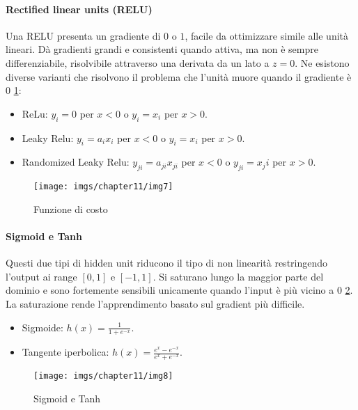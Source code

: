 		\paragraph{Rectified linear units (RELU)}
		Una RELU presenta un gradiente di $0$ o $1$, facile da ottimizzare simile alle unit\`a lineari.
		D\`a gradienti grandi e consistenti quando attiva, ma non \`e sempre differenziabile, risolvibile attraverso una derivata da un lato a $z=0$.
		Ne esistono diverse varianti che risolvono il problema che l'unit\`a muore quando il gradiente \`e $0$ \ref{fig:chapter11-07}:
		\begin{multicols}{2}
			\begin{itemize}
				\item ReLu: $y_i = 0$ per $x < 0$ o $y_i = x_i$ per $x >0$.
				\item Leaky Relu: $y_i = a_ix_i$ per $x < 0$ o $y_i = x_i$ per $x >0$.
				\item Randomized Leaky Relu: $y_{ji} = a_{ji}x_{ji}$ per $x < 0$ o $y_{ji} = x_{j}i$ per $x >0$.
			\end{itemize}
		\end{multicols}
		\begin{figure}
			\centering
			\texttt{[image: imgs/chapter11/img7]}
			\caption{Funzione di costo}
			\label{fig:chapter11-07}
		\end{figure}
		
		\paragraph{Sigmoid e Tanh}
		Questi due tipi di hidden unit riducono il tipo di non linearit\`a restringendo l'output ai range $[0,1]$ e $[-1,1]$.
		Si saturano lungo la maggior parte del dominio e sono fortemente sensibili unicamente quando l'input \`e pi\`u vicino a $0$ \ref{fig:chapter11-08}.
		La saturazione rende l'apprendimento basato sul gradient pi\`u difficile.
		\begin{multicols}{2}
			\begin{itemize}
				\item Sigmoide: $h(x) = \frac{1}{1+e^{-x}}$.
				\item Tangente iperbolica: $h(x) = \frac{e^x-e^{-x}}{e^x+e^{-x}}$.
			\end{itemize}
		\end{multicols}
		\begin{figure}
			\centering
			\texttt{[image: imgs/chapter11/img8]}
			\caption{Sigmoid e Tanh}
			\label{fig:chapter11-08}
		\end{figure}

